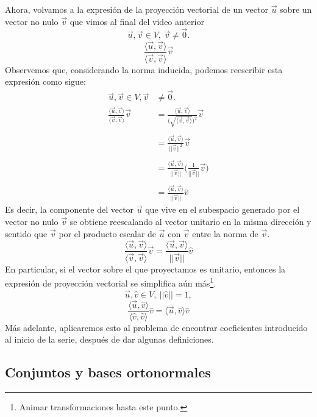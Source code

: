 \documentclass[12pt,dvipsnames]{article}
\numberwithin{equation}{section}
\begin{document}
Ahora, volvamos a la expresión de la proyección vectorial de un vector $\vec{u}$ sobre un vector no nulo $\vec{v}$ que vimos al final del video anterior
\[
\vec{u},\vec{v}\in V, \ \vec{v}\neq \vec{0}.
\] 
\[
\frac{\langle \vec{u} , \vec{v} \rangle}{\langle \vec{v} , \vec{v} \rangle} \vec{v} 
\] 
Observemos que, considerando la norma inducida, podemos reescribir esta expresión como sigue:
\begin{align*}
    \vec{u},\vec{v}\in V, \vec{v}&\neq \vec{0}. \\
    \frac{\langle \vec{u} , \vec{v} \rangle}{\langle \vec{v} , \vec{v} \rangle} \vec{v} &= \frac{\langle \vec{u} , \vec{v} \rangle}{\big(\sqrt{\langle \vec{v} , \vec{v} \rangle}\big)^2} \vec{v} \\ \\
                                                                                        &= \frac{\langle \vec{u} , \vec{v} \rangle}{||\vec{v}||^2} \vec{v} \\ \\
                                                                                        &= \frac{\langle \vec{u} , \vec{v} \rangle}{||\vec{v}||} \bigg( \frac{1}{||\vec{v}||} \vec{v} \bigg) \\ \\
                                                                                        &= \frac{\langle \vec{u} , \vec{v} \rangle}{||\vec{v}||} \hat{v}
\end{align*}
Es decir, la componente del vector $\vec{u}$ que vive en el subespacio generado por el vector no nulo $\vec{v}$ se obtiene reescalando al vector unitario en la misma dirección y sentido que $\vec{v}$ por el producto escalar de $\vec{u}$ con $\vec{v}$ entre la norma de $\vec{v}$.
\[
    \frac{\langle \vec{u} , \vec{v} \rangle}{\langle \vec{v} , \vec{v} \rangle} \vec{v} = \frac{\langle \vec{u} , \vec{v} \rangle}{||\vec{v}||} \hat{v}
\] 
En particular, si el vector sobre el que proyectamos es unitario, entonces la expresión de proyección vectorial se simplifica aún más\footnote{Animar transformaciones hasta este punto.}.
\[
\vec{u},\hat{v}\in V, \ ||\hat{v}||=1,
\] 
\[
    \frac{\langle \vec{u} , \hat{v} \rangle}{\langle \hat{v} , \hat{v} \rangle} \hat{v} = \langle \vec{u} , \hat{v} \rangle \hat{v}
\] 
Más adelante, aplicaremos esto al problema de encontrar coeficientes introducido al inicio de la serie, después de dar algunas definiciones.

\subsection{Conjuntos y bases ortonormales}
\end{document}
